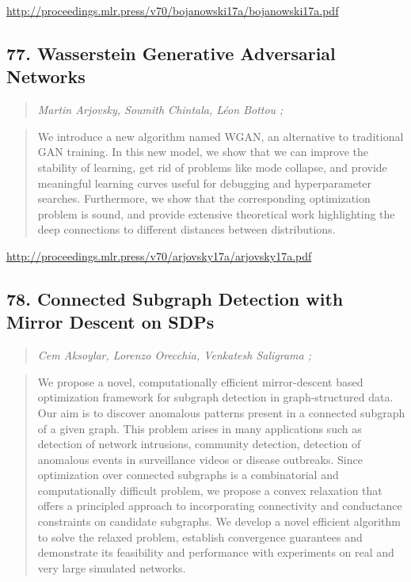 \documentclass{article}
\begin{document}
\href{http://proceedings.mlr.press/v70/bojanowski17a/bojanowski17a.pdf}{http://proceedings.mlr.press/v70/bojanowski17a/bojanowski17a.pdf}

\subsection{77. Wasserstein Generative Adversarial Networks}

\begin{quote}
\footnotesize{\textit{Martin Arjovsky, Soumith Chintala, Léon Bottou ;}}

\end{quote}

\begin{quote}
    We introduce a new algorithm named WGAN, an alternative to traditional GAN training. In this new model, we show that we can improve the stability of learning, get rid of problems like mode collapse, and provide meaningful learning curves useful for debugging and hyperparameter searches. Furthermore, we show that the corresponding optimization problem is sound, and provide extensive theoretical work highlighting the deep connections to different distances between distributions.  
\end{quote}

\href{http://proceedings.mlr.press/v70/arjovsky17a/arjovsky17a.pdf}{http://proceedings.mlr.press/v70/arjovsky17a/arjovsky17a.pdf}

\subsection{78. Connected Subgraph Detection with Mirror Descent on SDPs}

\begin{quote}
\footnotesize{\textit{Cem Aksoylar, Lorenzo Orecchia, Venkatesh Saligrama ;}}

\end{quote}

\begin{quote}
    We propose a novel, computationally efficient mirror-descent based optimization framework for subgraph detection in graph-structured data. Our aim is to discover anomalous patterns present in a connected subgraph of a given graph. This problem arises in many applications such as detection of network intrusions, community detection, detection of anomalous events in surveillance videos or disease outbreaks. Since optimization over connected subgraphs is a combinatorial and computationally difficult problem, we propose a convex relaxation that offers a principled approach to incorporating connectivity and conductance constraints on candidate subgraphs. We develop a novel efficient algorithm to solve the relaxed problem, establish convergence guarantees and demonstrate its feasibility and performance with experiments on real and very large simulated networks.  
\end{quote}
\end{document}
